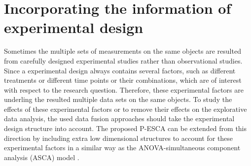 \section{Incorporating the information of experimental design}
Sometimes the multiple sets of measurements on the same objects are resulted from carefully designed experimental studies rather than observational studies. Since a experimental design always contains several factors, such as different treatments or different time points or their combinations, which are of interest with respect to the research question. Therefore, these experimental factors are underling the resulted multiple data sets on the same objects. To study the effects of these experimental factors or to remove their effects on the explorative data analysis, the used data fusion approaches should take the experimental design structure into account. The proposed P-ESCA can be extended from this direction by including extra low dimensional structures to account for these experimental factors in a similar way as the ANOVA-simultaneous component analysis (ASCA) model \cite{smilde2005anova}.




























